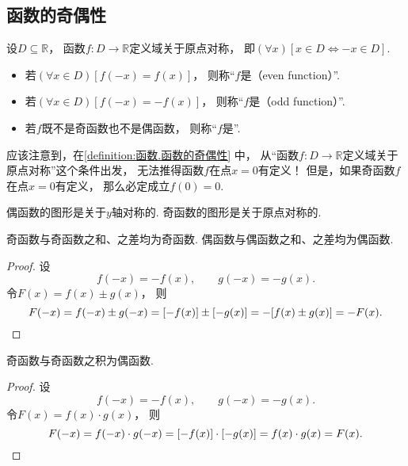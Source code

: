 \subsection{函数的奇偶性}
\begin{definition}\label{definition:函数.函数的奇偶性}
设\(D\subseteq\mathbb{R}\)，
函数\(f\colon D\to\mathbb{R}\)定义域关于原点对称，
即\((\forall x)[x \in D \iff -x \in D]\).
\begin{itemize}
	\item 若\((\forall x \in D)
	[f(-x) = f(x)]\)，
	则称“\(f\)是（even function）”.

	\item 若\((\forall x \in D)
	[f(-x) = -f(x)]\)，
	则称“\(f\)是（odd function）”.

	\item 若\(f\)既不是奇函数也不是偶函数，
	则称“\(f\)是”.
\end{itemize}
\end{definition}
\begin{remark}
应该注意到，在\cref{definition:函数.函数的奇偶性} 中，
从“函数\(f\colon D\to\mathbb{R}\)定义域关于原点对称”这个条件出发，
无法推得函数\(f\)在点\(x=0\)有定义！
但是，如果奇函数\(f\)在点\(x=0\)有定义，
那么必定成立\(f(0) = 0\).
\end{remark}

\begin{property}
偶函数的图形是关于\(y\)轴对称的.
奇函数的图形是关于原点对称的.
\end{property}

\begin{property}
奇函数与奇函数之和、之差均为奇函数.
偶函数与偶函数之和、之差均为偶函数.
\begin{proof}
设\begin{equation*}
	f(-x) = -f(x),
	\qquad
	g(-x) = -g(x).
\end{equation*}
令\(F(x) = f(x) \pm g(x)\)，
则\begin{equation*}
	F(-x) = f(-x) \pm g(-x)
	= [-f(x)] \pm [-g(x)]
	= -[f(x) \pm g(x)]
	= -F(x).
	\qedhere
\end{equation*}
\end{proof}
\end{property}

\begin{property}
奇函数与奇函数之积为偶函数.
\begin{proof}
设\begin{equation*}
	f(-x) = -f(x),
	\qquad
	g(-x) = -g(x).
\end{equation*}
令\(F(x) = f(x) \cdot g(x)\)，
则\begin{equation*}
	F(-x) = f(-x) \cdot g(-x)
	= [-f(x)] \cdot [-g(x)]
	= f(x) \cdot g(x)
	= F(x).
	\qedhere
\end{equation*}
\end{proof}
\end{property}

